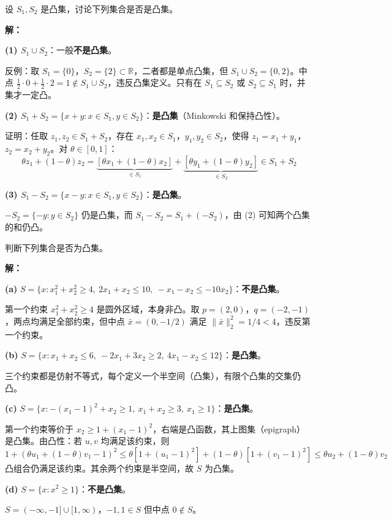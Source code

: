 \begin{example}[凸集的运算性质]\label{ex:convex-set-ops}
设 $S_1, S_2$ 是凸集，讨论下列集合是否是凸集。

\textbf{解：}

\textbf{(1) $S_1 \cup S_2$}：一般\textbf{不是凸集}。

反例：取 $S_1 = \{0\}$，$S_2 = \{2\} \subset \mathbb{R}$，二者都是单点凸集，但 $S_1 \cup S_2 = \{0, 2\}$。中点 $\frac{1}{2} \cdot 0 + \frac{1}{2} \cdot 2 = 1 \notin S_1 \cup S_2$，违反凸集定义。只有在 $S_1 \subseteq S_2$ 或 $S_2 \subseteq S_1$ 时，并集才一定凸。

\textbf{(2) $S_1 + S_2 = \{x + y : x \in S_1, y \in S_2\}$}：\textbf{是凸集}（Minkowski 和保持凸性）。

证明：任取 $z_1, z_2 \in S_1 + S_2$，存在 $x_1, x_2 \in S_1$，$y_1, y_2 \in S_2$，使得 $z_1 = x_1 + y_1$，$z_2 = x_2 + y_2$。对 $\theta \in [0,1]$：
\[
\theta z_1 + (1-\theta) z_2 = \underbrace{[\theta x_1 + (1-\theta) x_2]}_{\in S_1} + \underbrace{[\theta y_1 + (1-\theta) y_2]}_{\in S_2} \in S_1 + S_2
\]

\textbf{(3) $S_1 - S_2 = \{x - y : x \in S_1, y \in S_2\}$}：\textbf{是凸集}。

$-S_2 = \{-y : y \in S_2\}$ 仍是凸集，而 $S_1 - S_2 = S_1 + (-S_2)$，由 (2) 可知两个凸集的和仍凸。
\end{example}

\begin{example}[判断集合是否为凸集]\label{ex:convex-set-judge}
判断下列集合是否为凸集。

\textbf{解：}

\textbf{(a)} $S = \{x : x_1^2 + x_2^2 \geq 4,\ 2x_1 + x_2 \leq 10,\ -x_1 - x_2 \leq -10x_2\}$：\textbf{不是凸集}。

第一个约束 $x_1^2 + x_2^2 \geq 4$ 是圆外区域，本身非凸。取 $p = (2, 0)$，$q = (-2, -1)$，两点均满足全部约束，但中点 $\bar{x} = (0, -1/2)$ 满足 $\|\bar{x}\|_2^2 = 1/4 < 4$，违反第一个约束。

\textbf{(b)} $S = \{x : x_1 + x_2 \leq 6,\ -2x_1 + 3x_2 \geq 2,\ 4x_1 - x_2 \leq 12\}$：\textbf{是凸集}。

三个约束都是仿射不等式，每个定义一个半空间（凸集），有限个凸集的交集仍凸。

\textbf{(c)} $S = \{x : -(x_1-1)^2 + x_2 \geq 1,\ x_1 + x_2 \geq 3,\ x_1 \geq 1\}$：\textbf{是凸集}。

第一个约束等价于 $x_2 \geq 1 + (x_1 - 1)^2$，右端是凸函数，其上图集（epigraph）是凸集。由凸性：若 $u, v$ 均满足该约束，则
\[
1 + (\theta u_1 + (1-\theta) v_1 - 1)^2 \leq \theta[1 + (u_1-1)^2] + (1-\theta)[1 + (v_1-1)^2] \leq \theta u_2 + (1-\theta) v_2
\]
凸组合仍满足该约束。其余两个约束是半空间，故 $S$ 为凸集。

\textbf{(d)} $S = \{x : x^2 \geq 1\}$：\textbf{不是凸集}。

$S = (-\infty, -1] \cup [1, \infty)$，$-1, 1 \in S$ 但中点 $0 \notin S$。
\end{example}

